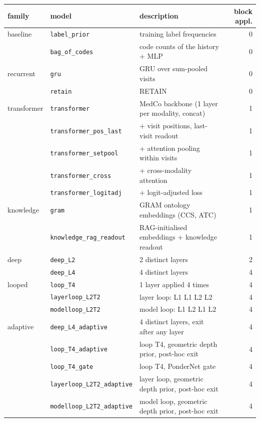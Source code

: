 \begin{tabular}{lllr}
\toprule
family & model & description & block appl.\\
\midrule
baseline & \texttt{label\_prior} & training label frequencies & 0\\
 & \texttt{bag\_of\_codes} & code counts of the history + MLP & 0\\
\midrule
recurrent & \texttt{gru} & GRU over sum-pooled visits & 0\\
 & \texttt{retain} & RETAIN & 0\\
\midrule
transformer & \texttt{transformer} & MedCo backbone (1 layer per modality, concat) & 1\\
 & \texttt{transformer\_pos\_last} & + visit positions, last-visit readout & 1\\
 & \texttt{transformer\_setpool} & + attention pooling within visits & 1\\
 & \texttt{transformer\_cross} & + cross-modality attention & 1\\
 & \texttt{transformer\_logitadj} & + logit-adjusted loss & 1\\
\midrule
knowledge & \texttt{gram} & GRAM ontology embeddings (CCS, ATC) & 1\\
 & \texttt{knowledge\_rag\_readout} & RAG-initialised embeddings + knowledge readout & 1\\
\midrule
deep & \texttt{deep\_L2} & 2 distinct layers & 2\\
 & \texttt{deep\_L4} & 4 distinct layers & 4\\
\midrule
looped & \texttt{loop\_T4} & 1 layer applied 4 times & 4\\
 & \texttt{layerloop\_L2T2} & layer loop: L1 L1 L2 L2 & 4\\
 & \texttt{modelloop\_L2T2} & model loop: L1 L2 L1 L2 & 4\\
\midrule
adaptive & \texttt{deep\_L4\_adaptive} & 4 distinct layers, exit after any layer & 4\\
 & \texttt{loop\_T4\_adaptive} & loop T4, geometric depth prior, post-hoc exit & 4\\
 & \texttt{loop\_T4\_gate} & loop T4, PonderNet gate & 4\\
 & \texttt{layerloop\_L2T2\_adaptive} & layer loop, geometric depth prior, post-hoc exit & 4\\
 & \texttt{modelloop\_L2T2\_adaptive} & model loop, geometric depth prior, post-hoc exit & 4\\
\bottomrule
\end{tabular}

